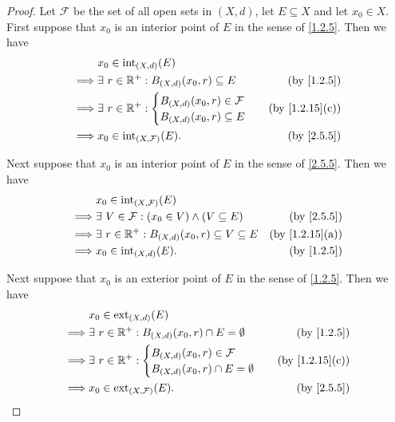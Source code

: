 \begin{proof}
  Let \(\mathcal{F}\) be the set of all open sets in \((X, d)\), let \(E \subseteq X\) and let \(x_0 \in X\).
  First suppose that \(x_0\) is an interior point of \(E\) in the sense of \cref{1.2.5}.
  Then we have
  \begin{align*}
             & x_0 \in \text{int}_{(X, d)}(E)                                                  \\
    \implies & \exists\ r \in \R^+ : B_{(X, d)}(x_0, r) \subseteq E & \text{(by \cref{1.2.5})} \\
    \implies & \exists\ r \in \R^+ : \begin{cases}
                                       B_{(X, d)}(x_0, r) \in \mathcal{F} \\
                                       B_{(X, d)}(x_0, r) \subseteq E
                                     \end{cases}                & \text{(by \cref{1.2.15}(c))} \\
    \implies & x_0 \in \text{int}_{(X, \mathcal{F})}(E).            & \text{(by \cref{2.5.5})}
  \end{align*}

  Next suppose that \(x_0\) is an interior point of \(E\) in the sense of \cref{2.5.5}.
  Then we have
  \begin{align*}
             & x_0 \in \text{int}_{(X, \mathcal{F})}(E)                                                        \\
    \implies & \exists\ V \in \mathcal{F} : (x_0 \in V) \land (V \subseteq E)   & \text{(by \cref{2.5.5})}     \\
    \implies & \exists\ r \in \R^+ : B_{(X, d)}(x_0, r) \subseteq V \subseteq E & \text{(by \cref{1.2.15}(a))} \\
    \implies & x_0 \in \text{int}_{(X, d)}(E).                                  & \text{(by \cref{1.2.5})}
  \end{align*}

  Next suppose that \(x_0\) is an exterior point of \(E\) in the sense of \cref{1.2.5}.
  Then we have
  \begin{align*}
             & x_0 \in \text{ext}_{(X, d)}(E)                                                         \\
    \implies & \exists\ r \in \R^+ : B_{(X, d)}(x_0, r) \cap E = \emptyset & \text{(by \cref{1.2.5})} \\
    \implies & \exists\ r \in \R^+ : \begin{cases}
                                       B_{(X, d)}(x_0, r) \in \mathcal{F} \\
                                       B_{(X, d)}(x_0, r) \cap E = \emptyset
                                     \end{cases}                       & \text{(by \cref{1.2.15}(c))} \\
    \implies & x_0 \in \text{ext}_{(X, \mathcal{F})}(E).                   & \text{(by \cref{2.5.5})}
  \end{align*}


\end{proof}
